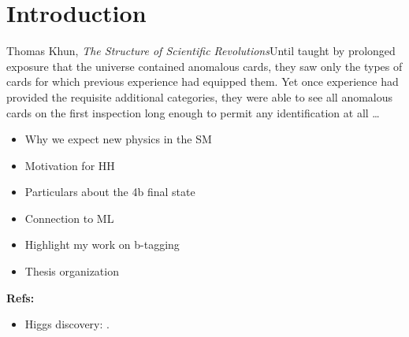 \chapter{Introduction}
\begin{chapquote}{Thomas Khun, \emph{The Structure of Scientific Revolutions}}{Until taught by prolonged exposure that the universe contained anomalous cards, they saw only the types of cards for which previous experience had equipped them. Yet once experience had provided the requisite additional categories, they were able to see all anomalous cards on the first inspection long enough to permit any identification at all \ldots}
\end{chapquote}


\begin{itemize}
	\item Why we expect new physics in the SM
	\item Motivation for HH
	\item Particulars about the 4b final state
	\item Connection to ML
	\item Highlight my work on b-tagging
	\item Thesis organization
\end{itemize}


\textbf{Refs: }
\begin{itemize}
\item Higgs discovery:  \cite{HIGG-2012-27, CMS-HIG-12-028}.
\end{itemize}